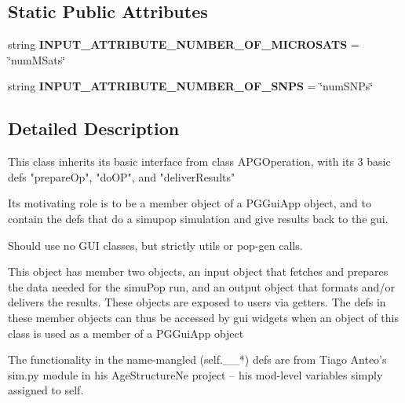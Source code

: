 \subsection*{Static Public Attributes}
\begin{DoxyCompactItemize}
\item 
string {\bfseries I\+N\+P\+U\+T\+\_\+\+A\+T\+T\+R\+I\+B\+U\+T\+E\+\_\+\+N\+U\+M\+B\+E\+R\+\_\+\+O\+F\+\_\+\+M\+I\+C\+R\+O\+S\+A\+TS} = \char`\"{}num\+M\+Sats\char`\"{}\hypertarget{classnegui_1_1pgopsimupop_1_1PGOpSimuPop_afad9fd5e836335f749ae96a958d3786e}{}\label{classnegui_1_1pgopsimupop_1_1PGOpSimuPop_afad9fd5e836335f749ae96a958d3786e}

\item 
string {\bfseries I\+N\+P\+U\+T\+\_\+\+A\+T\+T\+R\+I\+B\+U\+T\+E\+\_\+\+N\+U\+M\+B\+E\+R\+\_\+\+O\+F\+\_\+\+S\+N\+PS} = \char`\"{}num\+S\+N\+Ps\char`\"{}\hypertarget{classnegui_1_1pgopsimupop_1_1PGOpSimuPop_ac0c65641439fe744a0b62bd037145b3b}{}\label{classnegui_1_1pgopsimupop_1_1PGOpSimuPop_ac0c65641439fe744a0b62bd037145b3b}

\end{DoxyCompactItemize}


\subsection{Detailed Description}
\begin{DoxyVerb}This class inherits its basic interface from class APGOperation, with its 3
basic defs "prepareOp", "doOP", and "deliverResults"

Its motivating role is to be a member object of a PGGuiApp object, and to contain the
defs that do a simupop simulation and give results back to the gui.

Should use no GUI classes, but strictly utils or pop-gen calls.

This object has member two objects, an input object that fetches and prepares the
data needed for the simuPop run, and an output object that formats and/or delivers
the results.   These objects are exposed to users via getters.  The defs in these 
member objects can thus be accessed by gui widgets when an object of this class  
is used as a member of a PGGuiApp object

The functionality in the name-mangled (self.__*) defs are from Tiago Anteo's sim.py module in 
his AgeStructureNe project -- his mod-level variables simply assigned to self.
\end{DoxyVerb}
 

